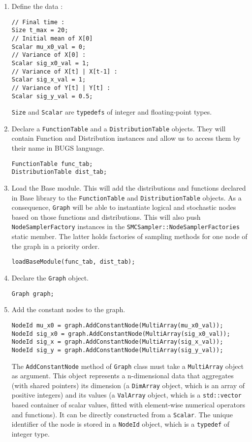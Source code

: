 \begin{enumerate}
 \item Define the data :
\begin{lstlisting}
// Final time :
Size t_max = 20;
// Initial mean of X[0]
Scalar mu_x0_val = 0;
// Variance of X[0] :
Scalar sig_x0_val = 1;
// Variance of X[t] | X[t-1] :
Scalar sig_x_val = 1;
// Variance of Y[t] | Y[t] :
Scalar sig_y_val = 0.5;
\end{lstlisting}
\texttt{Size} and \texttt{Scalar} are \verb=typedefs= of integer and floating-point types.


 \item Declare a \texttt{FunctionTable} and a \texttt{DistributionTable} objects. They will contain Function and Distribution instances and allow us to access them by their name in BUGS language.
\begin{lstlisting}
FunctionTable func_tab;
DistributionTable dist_tab;
\end{lstlisting}


 \item Load the Base module. This will add the distributions and functions declared in \biips Base library to the \texttt{FunctionTable} and \texttt{DistributionTable} objects. As a consequence, \texttt{Graph} will be able to instantiate logical and stochastic nodes based on those functions and distributions. This will also push \texttt{NodeSamplerFactory} instances in the \texttt{SMCSampler::NodeSamplerFactories} static member. The latter holds factories of sampling methods for one node of the graph in a priority order.
\begin{lstlisting}
loadBaseModule(func_tab, dist_tab);
\end{lstlisting}


 \item Declare the \texttt{Graph} object.
\begin{lstlisting}
Graph graph;
\end{lstlisting}


 \item Add the constant nodes to the graph.
\begin{lstlisting}
NodeId mu_x0 = graph.AddConstantNode(MultiArray(mu_x0_val));
NodeId sig_x0 = graph.AddConstantNode(MultiArray(sig_x0_val));
NodeId sig_x = graph.AddConstantNode(MultiArray(sig_x_val));
NodeId sig_y = graph.AddConstantNode(MultiArray(sig_y_val));
\end{lstlisting}
The \texttt{AddConstantNode} method of \texttt{Graph} class must take a \texttt{MultiArray} object as argument. This object represents a n-dimensional data that aggregates (with shared pointers) its dimension (a \texttt{DimArray} object, which is an array of positive integers) and its values (a \texttt{ValArray} object, which is a \verb!std::vector! based container of scalar values, fitted with element-wise numerical operators and functions). It can be directly constructed from a \texttt{Scalar}. The unique identifier of the node is stored in a \texttt{NodeId} object, which is a \verb=typedef= of integer type.



\end{enumerate}
